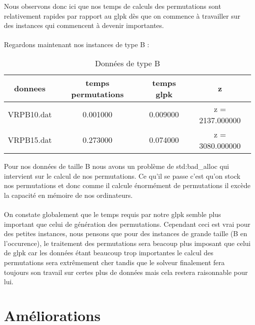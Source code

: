 \documentclass[a4paper,sffamily,12pt]{article}
\begin{document}
		\vspace{0.5cm}		
		
		Nous observons donc ici que nos temps de calculs des permutations sont relativement rapides par rapport au glpk dès que on commence à travailler sur des instances qui commencent à devenir importantes. \\
		\\
	Regardons maintenant nos instances de type B : \\

		\begin{table}[!h]
				
			\centering
				
			\begin{tabular}{| c | c | c | c |}
			    	
			    	\hline
			  	 donnees  & temps permutations & temps glpk  &  z   \\
				\hline
				VRPB10.dat	&	0.001000		&	0.009000	&		z = 2137.000000\\
				\hline
				VRPB15.dat	&	0.273000		&	0.074000	&		z = 3080.000000\\
				\hline
				
			\end{tabular}
			
			\caption{Données de type B}	
			
		\end{table}

		\vspace{0.5cm}		
		
		Pour nos données de taille B nous avons un problème de std:bad\_alloc qui intervient sur le calcul de nos permutations. Ce qu'il se passe c'est qu'on stock nos permutations et donc comme il calcule énormément de permutations il excède la capacité en mémoire de nos ordinateurs. \\
		\\
		\indent On constate globalement que le temps requis par notre glpk semble plus important que celui de génération des permutations. Cependant ceci est vrai pour des petites instances, nous pensons que pour des instances de grande taille (B en l'occurence), le traitement des permutations sera beacoup plus imposant que celui de glpk car les données étant beaucoup trop importantes le calcul des permutations sera extrêmement cher tandis que le solveur finalement fera toujours son travail sur certes plus de données mais cela restera raisonnable pour lui. \\

						
	\section{Améliorations}
	
\end{document}
